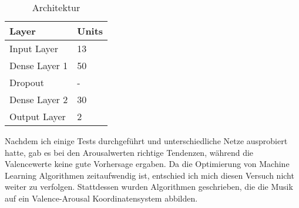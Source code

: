 \documentclass[11pt,a4paper]{article}
\begin{document}
\begin{table}[h!]
\centering
\begin{tabular}{l | l}
\textbf{Layer} & \textbf{Units}\\
\hline
Input Layer & 13\\
Dense Layer 1 & 50\\
Dropout & -\\
Dense Layer 2 & 30\\
Output Layer & 2\\
\end{tabular}
\caption[Architektur]{Architektur}
\end{table}
\noindent
Nachdem ich einige Tests durchgeführt und unterschiedliche Netze ausprobiert hatte, gab es bei den Arousalwerten richtige Tendenzen, während die Valencewerte keine gute Vorhersage ergaben. Da die Optimierung von Machine Learning Algorithmen zeitaufwendig ist, entschied ich mich diesen Versuch nicht weiter zu verfolgen. Stattdessen wurden Algorithmen geschrieben, die die Musik auf ein Valence-Arousal Koordinatensystem abbilden.
\end{document}
